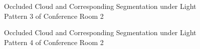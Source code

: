 \documentclass[11pt, a4paper,oneside,chapterprefix=false]{scrbook}
\begin{document}
\begin{figure}[H]
    \centering
      \label{fig:conf2 5 occluded} \hfill
     \label{fig:conf2 5 seg}
    \caption{Occluded Cloud and Corresponding Segmentation under Light Pattern 3 of Conference Room 2}
    \label{fig:conf2 5 occ and seg}
\end{figure}

\begin{figure}[H]
    \centering
      \label{fig:conf2 6 occluded} \hfill
     \label{fig:conf2 6 seg}
    \caption{Occluded Cloud and Corresponding Segmentation under Light Pattern 4 of Conference Room 2}
    \label{fig:conf2 6 occ and seg}
\end{figure}
\end{document}
